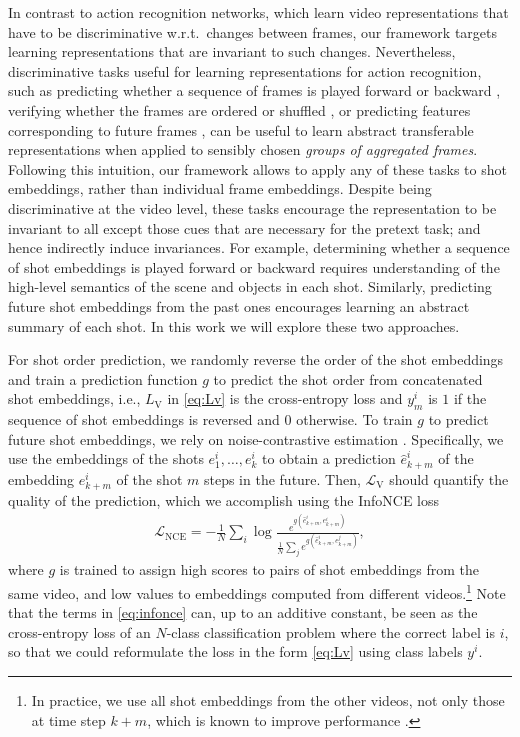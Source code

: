 \documentclass[10pt,twocolumn,letterpaper]{article}
\newcommand{\yim}{y^i_m}
\newcommand{\lv}{L_\text{V}}
\newcommand{\Lv}{\mathcal L_\text{V}}
\newcommand{\Lnce}{\mathcal L_\text{NCE}}
\begin{document}
In contrast to action recognition networks, which learn video representations that have to be discriminative w.r.t.\ changes between frames, our framework targets learning representations that are invariant to such changes.
Nevertheless, discriminative tasks useful for learning representations for action recognition, such as predicting whether a sequence of frames is played forward or backward \cite{wei2018learning}, verifying whether the frames are ordered or shuffled \cite{misra2016shuffle}, or predicting features corresponding to future frames \cite{han2019video}, can be useful to learn abstract transferable representations when applied to sensibly chosen \emph{groups of aggregated frames}.
Following this intuition, our framework allows to apply any of these tasks to shot embeddings, rather than individual frame embeddings.
Despite being discriminative at the video level, these tasks encourage the representation to be invariant to all except those cues that are necessary for the pretext task; and hence indirectly induce invariances.
For example, determining whether a sequence of shot embeddings is played forward or backward requires understanding of the high-level semantics of the scene and objects in each shot.
Similarly, predicting future shot embeddings from the past ones encourages learning an abstract summary of each shot.
In this work we will explore these two approaches. 

For shot order prediction, we randomly reverse the order of the shot embeddings and train a prediction function $g$ to predict the shot order from concatenated shot embeddings, i.e., $\lv$ in \eqref{eq:Lv} is the cross-entropy loss and $\yim$ is $1$ if the sequence of shot embeddings is reversed and $0$ otherwise.
To train $g$ to predict future shot embeddings, we rely on noise-contrastive estimation \cite{gutmann2010noise}. Specifically, we use the embeddings of the shots $e^i_1, \ldots, e^i_k$ to obtain a prediction $\hat{e}^i_{k+m}$ of the embedding $e^i_{k+m}$ of the shot $m$ steps in the future.
Then, $\Lv$ should quantify the quality of the prediction, which we accomplish using the InfoNCE loss~\cite{oord2018representation}
\begin{align}\label{eq:infonce}
     \Lnce = -\frac{1}{N}\sum_i \log \frac{e^{g(\hat{e}_{k+m}^i, e_{k+m}^i)}}{\frac{1}{N} \sum_j e^{g(\hat{e}_{k+m}^i, e_{k+m}^j)}},
\end{align}
where $g$ is trained to assign high scores to pairs of shot embeddings from the same video, and low values to embeddings computed from different videos.\footnote{In practice, we use all shot embeddings from the other videos, not only those at time step $k+m$, which is known to improve performance \cite{oord2018representation}.} Note that the terms in \eqref{eq:infonce} can, up to an additive constant, be seen as the cross-entropy loss of an $N$-class classification problem where the correct label is $i$, so that we could reformulate the loss in the form \eqref{eq:Lv} using class labels $y^i$.
\end{document}

